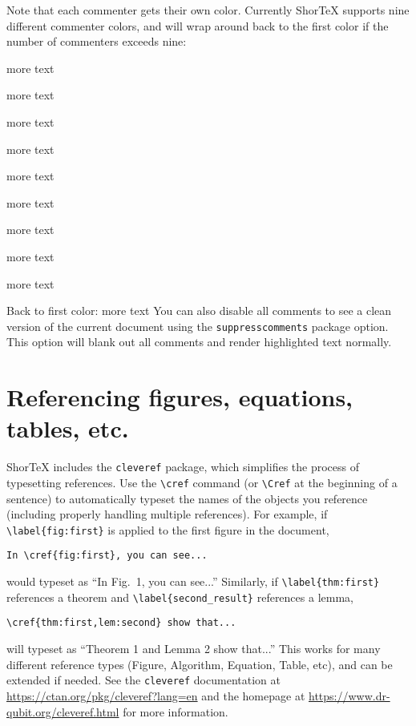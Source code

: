 \documentclass{article}
\begin{document}
Note that each commenter gets their own color. Currently ShorTeX supports nine different commenter colors,
and will wrap around back to the first color if the number of commenters exceeds nine:
\bitem
\setlength{\itemsep}{0pt}
\item {}more text
\item {}more text
\item {}more text
\item {}more text
\item {}more text
\item {}more text
\item {}more text
\item {}more text
\item {}more text
\item Back to first color: more text
\eitem
You can also disable all comments to see a clean version of the current 
document using the \verb!suppresscomments! package option.
This option will blank out all comments and render highlighted text normally.

\newpage
\section{Referencing figures, equations, tables, etc.}

ShorTeX includes the \texttt{cleveref} package, which simplifies the process
of typesetting references. Use the \verb!\cref! command (or \verb!\Cref! at the beginning of a sentence) 
to automatically typeset the names of the objects you reference (including properly handling multiple references). 
For example, if \verb!\label{fig:first}! is applied to the first figure in the document,
\begin{verbatim}
In \cref{fig:first}, you can see...
\end{verbatim}
would typeset as ``In Fig.~1, you can see...''
Similarly, if \verb!\label{thm:first}! references a theorem and \verb!\label{second_result}! references
a lemma, 
\begin{verbatim}
\cref{thm:first,lem:second} show that...
\end{verbatim}
will typeset as ``Theorem 1 and Lemma 2 show that...''
This works for many different reference types (Figure, Algorithm, Equation, Table, etc),
and can be extended if needed. See the \texttt{cleveref} documentation 
at \url{https://ctan.org/pkg/cleveref?lang=en} and the homepage at \url{https://www.dr-qubit.org/cleveref.html} 
for more information.
\end{document}
